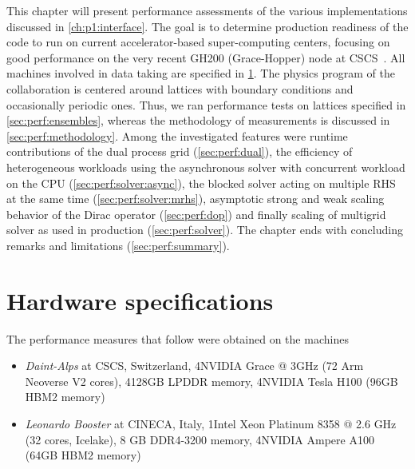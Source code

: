 This chapter will present performance assessments of the various implementations discussed in \cref{ch:p1:interface}.
The goal is to determine production readiness of the code to run on current accelerator-based super-computing centers, focusing on good performance on the very recent GH200 (Grace-Hopper) node at CSCS~\cite{fusco2024}.
All machines involved in data taking are specified in \cref{sec:perf:hardware}.
The physics program of the \RCstar collaboration is centered around lattices with \Cstar boundary conditions and occasionally periodic ones.
Thus, we ran performance tests on lattices specified in \cref{sec:perf:ensembles}, whereas the methodology of measurements is discussed in \cref{sec:perf:methodology}.
Among the investigated features were runtime contributions of the dual process grid (\cref{sec:perf:dual}), the efficiency of  heterogeneous workloads using the asynchronous solver with concurrent workload on the CPU (\cref{sec:perf:solver:async}), the blocked solver acting on multiple RHS at the same time (\cref{sec:perf:solver:mrhs}), asymptotic strong and weak scaling behavior of the Dirac operator (\cref{sec:perf:dop}) and finally scaling of multigrid solver as used in production (\cref{sec:perf:solver}).
The chapter ends with concluding remarks and limitations (\cref{sec:perf:summary}).

\section{Hardware specifications}
\label{sec:perf:hardware}

\newcommand{\datataking}[1]{The data was taken on \emph{#1}, see \cref{sec:perf:hardware}.}

The performance measures that follow were obtained on the machines
\begin{itemize}
    \item \emph{Daint-Alps} at CSCS, Switzerland, 4\x NVIDIA\textsuperscript{\textregistered} Grace @ 3GHz (72 Arm Neoverse V2 cores), 4\x 128GB LPDDR memory, 4\x NVIDIA\textsuperscript{\textregistered} Tesla\textsuperscript{\textregistered} H100 (96GB HBM2 memory)
    \item \emph{Leonardo Booster} at CINECA, Italy, 1\x Intel\textsuperscript{\textregistered} Xeon\textsuperscript{\textregistered} Platinum 8358 @ 2.6 GHz (32 cores, Icelake), 8 GB DDR4-3200 memory, 4\x NVIDIA\textsuperscript{\textregistered} Ampere A100 (64GB HBM2 memory)~\cite{leonardo:booster}
\end{itemize}

